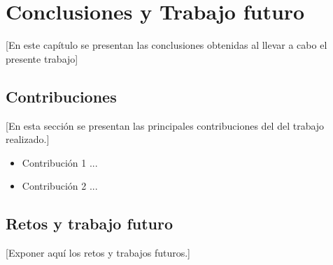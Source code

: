 \chapter{Conclusiones y Trabajo futuro}\label{cap:conclusiones}

[En este capítulo se presentan las conclusiones obtenidas al llevar a cabo el presente trabajo]

\section{Contribuciones}

[En esta sección se presentan las principales contribuciones del del trabajo realizado.]

\begin{itemize}
    
    \item Contribución 1 ...
    
    \item Contribución 2 ...
    
\end{itemize}

\section{Retos y trabajo futuro}

[Exponer aquí los retos y trabajos futuros.]